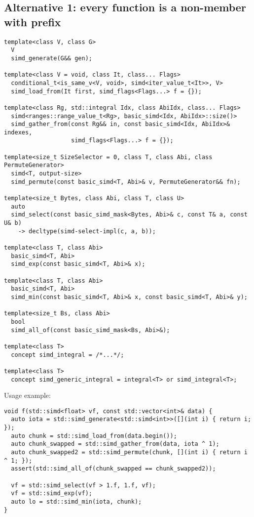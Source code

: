 \subsection{Alternative 1: every function is a non-member with  prefix}

\medskip\begin{lstlisting}[style=Vc]
template<class V, class G>
  V
  simd_generate(G&& gen);

template<class V = void, class It, class... Flags>
  conditional_t<is_same_v<V, void>, simd<iter_value_t<It>>, V>
  simd_load_from(It first, simd_flags<Flags...> f = {});

template<class Rg, std::integral Idx, class AbiIdx, class... Flags>
  simd<ranges::range_value_t<Rg>, basic_simd<Idx, AbiIdx>::size()>
  simd_gather_from(const Rg&& in, const basic_simd<Idx, AbiIdx>& indexes,
                   simd_flags<Flags...> f = {});

template<size_t SizeSelector = 0, class T, class Abi, class PermuteGenerator>
  simd<T, output-size>
  simd_permute(const basic_simd<T, Abi>& v, PermuteGenerator&& fn);

template<size_t Bytes, class Abi, class T, class U>
  auto
  simd_select(const basic_simd_mask<Bytes, Abi>& c, const T& a, const U& b)
    -> decltype(simd-select-impl(c, a, b));

template<class T, class Abi>
  basic_simd<T, Abi>
  simd_exp(const basic_simd<T, Abi>& x);

template<class T, class Abi>
  basic_simd<T, Abi>
  simd_min(const basic_simd<T, Abi>& x, const basic_simd<T, Abi>& y);

template<size_t Bs, class Abi>
  bool
  simd_all_of(const basic_simd_mask<Bs, Abi>&);

template<class T>
  concept simd_integral = /*...*/;

template<class T>
  concept simd_generic_integral = integral<T> or simd_integral<T>;
\end{lstlisting}

Usage example:
\medskip\begin{lstlisting}[style=Vc]
void f(std::simd<float> vf, const std::vector<int>& data) {
  auto iota = std::simd_generate<std::simd<int>>([](int i) { return i; });
  auto chunk = std::simd_load_from(data.begin());
  auto chunk_swapped = std::simd_gather_from(data, iota ^ 1);
  auto chunk_swapped2 = std::simd_permute(chunk, [](int i) { return i ^ 1; });
  assert(std::simd_all_of(chunk_swapped == chunk_swapped2));

  vf = std::simd_select(vf > 1.f, 1.f, vf);
  vf = std::simd_exp(vf);
  auto lo = std::simd_min(iota, chunk);
}
\end{lstlisting}

